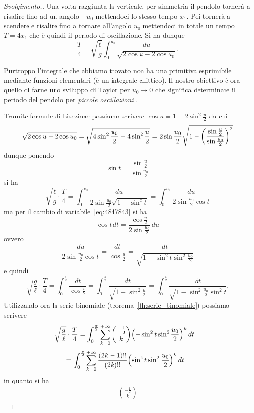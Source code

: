 \begin{proof}[Svolgimento.]
Una volta raggiunta la verticale, per simmetria il pendolo tornerà a risalire
fino ad un angolo $-u_0$ mettendoci lo stesso tempo $x_1$. Poi tornerà a scendere
e risalire fino a tornare all'angolo $u_0$ mettendoci in totale un tempo
$T=4x_1$ che è quindi il periodo di oscillazione. Si ha dunque
\[
  \frac{T}{4} = \sqrt{\frac \ell g}\int_0^{u_0} \frac{du}{\sqrt{2\cos u - 2\cos u_0}}.
\]

Purtroppo l'integrale che abbiamo trovato non ha una primitiva
esprimibile mediante funzioni elementari (è un integrale ellittico).
Il nostro obiettivo è ora quello di farne uno sviluppo di Taylor
per $u_0\to 0$ che significa determinare
il periodo del pendolo per \emph{piccole oscillazioni}%
.

Tramite formule di bisezione possiamo scrivere $\cos u = 1 - 2 \sin^2\frac u 2$
da cui
\[
 \sqrt{2\cos u - 2\cos u_0}
 = \sqrt{4\sin^2 \frac {u_0} 2 - 4 \sin^2 \frac{u}{2}}
 = 2\sin \frac{u_0}2 \sqrt{1-{\left( \frac{\sin \frac u 2}{\sin \frac {u_0}2} \right)}^2}
\]
dunque ponendo
\begin{equation}\label{eq:4847843}
 \sin t = \frac{\sin \frac u 2}{\sin \frac{u_0} 2}
\end{equation}
si ha
\[
  \sqrt{\frac \ell g} \cdot \frac T 4
  =  \int_0^{u_0} \frac{du}{2\sin \frac {u_0}2 \sqrt{1-\sin^2 t}}
  = \int_0^{u_0} \frac{du}{2\sin \frac{u_0}2 \cos t}
\]
ma per il cambio di variabile~\eqref{eq:4847843} si ha
\[
  \cos t \, dt = \frac{\cos \frac u 2 }{2 \sin \frac{u_0} 2}\, du
\]
ovvero
\[
 \frac{du}{2\sin \frac {u_0} 2 \cos t} = \frac{dt}{\cos \frac u 2}
 = \frac{dt}{\sqrt{1-\sin^2 t \sin^2\frac{u_0}{2}}}
\]
e quindi
\[
\sqrt{\frac g \ell} \cdot \frac{T}{4}
= \int_0^{\frac \pi 2} \frac{dt}{\cos \frac u 2}
= \int_0^{\frac \pi 2} \frac{dt}{\sqrt{1-\sin^2 \frac u 2}}
= \int_0^{\frac \pi 2} \frac{dt}{\sqrt{1-\sin^2 \frac{u_0}{2} \sin^2 t}}.
\]
Utilizzando ora la serie binomiale (teorema~\ref{th:serie_binomiale})
possiamo scrivere
\begin{align*}
\sqrt{\frac g \ell} \cdot\frac{T}{4}
&= \int_0^{\frac \pi 2} \sum_{k=0}^{+\infty}{-\frac 1 2 \choose k} {\left( -\sin^2 t\sin^2 \frac{u_0}2 \right)}^{k}\, dt
\end{align*}
\begin{align*}
&= \int_0^{\frac \pi 2} \sum_{k=0}^{+\infty}\frac{(2k-1)!!}{(2k)!!} {\left( \sin^2 t\sin^2 \frac{u_0}2 \right)}^{k}\, dt
\end{align*}
in quanto si ha
\begin{align*}
  {-\frac 1 2 \choose k}

\end{align*}
\end{proof}
